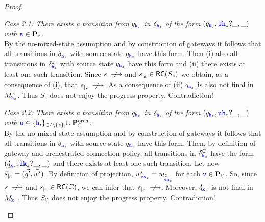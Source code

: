 \begin{proof}
\begin{description}
\begin{description}
\item \emph{Case 2.1:
There exists a transition from $q_{\HH_z}$ in $\delta_{\HH_{z}}$ of the form
$(q_{\HH_z},\tts\HH_z?\_,\_)$ with $\tts\in\roles_z$.}\\
By the no-mixed-state assumption and by construction of gateways
it follows that all transitions in $\delta_{\HH_{z}}$ with source state
$q_{\HH_z}$ have this form.
Then (i) also all transitions in $\delta^z_{\HH_{z}}$ with source state
$q_{\HH_z}$ have this form and (ii) there exists at least one such transition.
Since $s\notlts{}$ and $\restrict{s}{z}\in \RS(S_z)$ we obtain, as a consequence of (i), that $\restrict{s}{z}\notlts{}$. As a consequence of (ii) $q_{\HH_z}$ is also not final in $M^z_{\HH_z}$. 
Thus $S_z$ does not enjoy the progress property. Contradiction!
%
\item \emph{Case 2.2:
There exists a transition from $q_{\HH_z}$ in $\delta_{\HH_{z}}$ of the form
$(q_{\HH_z},\ttu\HH_z?\_,\_)$ with $\ttu\in\Set{\hh_i}_{ \in I\setminus\Set{z}}\cup\rolesorch_{\cs}$.}\\
By the no-mixed-state assumption and by construction of gateways
it follows that all transitions in $\delta_{\HH_{z}}$ with source state
$q_{\HH_z}$ have this form. 
Then, by definition of gateway and orchestrated connection policy, all transitions
in $\delta^{\cs}_{\KK_{z}}$ have the form
$(\dot{q}_{\KK_z},\widetilde{\ttu}\KK_z?\_,\_)$ and there exists at least one such
transition.
Let now $\restrict{\vec{s}}{\cs}= (\vec{q'},\vec{w'})$.
By definition of projection,
$w'_{\ttv\KK_{z}}=w_{\widetilde{\widetilde{\ttv}}\HH_{z}}$  for each $\ttv\in\roles_{\cs}$.
So, since  $s \notlts{}$ and $\restrict{s}{\cs}\in \RS(\cs)$, we can infer that $\restrict{s}{\cs}\notlts{}$.
Moreover, $\dot{q}_{\KK_z}$ is not final in $M_{\KK_z}$.
Thus $S_{\cs}$ does not enjoy the progress property. Contradiction!
\end{description}
\end{description}
 

\end{proof}
